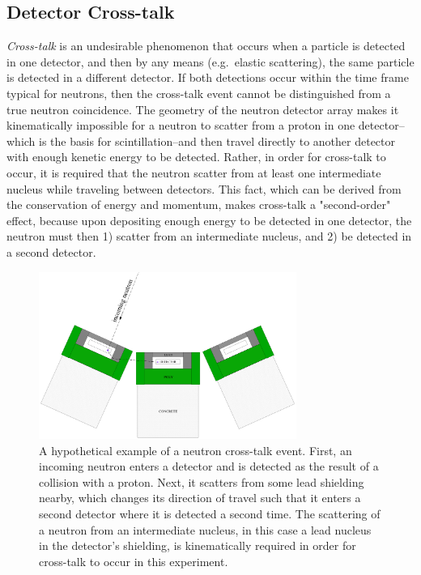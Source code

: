 \subsection{Detector Cross-talk}
\label{crosstalk}
\textit{Cross-talk} is an undesirable phenomenon that occurs when a particle is detected in one detector, and then by any means (e.g.\ elastic scattering), the same particle is detected in a different detector.
If both detections occur within the time frame typical for neutrons, then the cross-talk event cannot be distinguished from a true neutron coincidence.
The geometry of the neutron detector array makes it kinematically impossible for a neutron to scatter from a proton in one detector--which is the basis for scintillation--and then travel directly to another detector with enough kenetic energy to be detected.
Rather, in order for cross-talk to occur, it is required that the neutron scatter from at least one intermediate nucleus while traveling between detectors.
This fact, which can be derived from the conservation of energy and momentum, makes cross-talk a "second-order" effect, because upon depositing enough energy to be detected in one detector, the neutron must then 1) scatter from an intermediate nucleus, and 2) be detected in a second detector.
\begin{figure}
    \centering
    \includegraphics[width = 0.75\textwidth]{Content/Errors/CrossTalkExample.png}
    \caption{A hypothetical example of a neutron cross-talk event.
First, an incoming neutron enters a detector and is detected as the result of a collision with a proton.
Next, it scatters from some lead shielding nearby, which changes its direction of travel such that it enters a second detector where it is detected a second time.
The scattering of a neutron from an intermediate nucleus, in this case a lead nucleus in the detector's shielding, is kinematically required in order for cross-talk to occur in this experiment.}
    \label{fig:CrossTalkExamplepng}
\end{figure}
